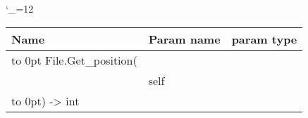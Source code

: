 \begingroup \catcode`\_=12 \tt
\begin{tabular}{lll}
\toprule
\textrm{Name}&\textrm{Param name}&\textrm{param type}\\
\midrule
\hbox to 0pt {File.Get_position(\hss}\\
& self\\
\hbox to 0pt{) -> int\hss}\\
\bottomrule
\end{tabular}
\endgroup
